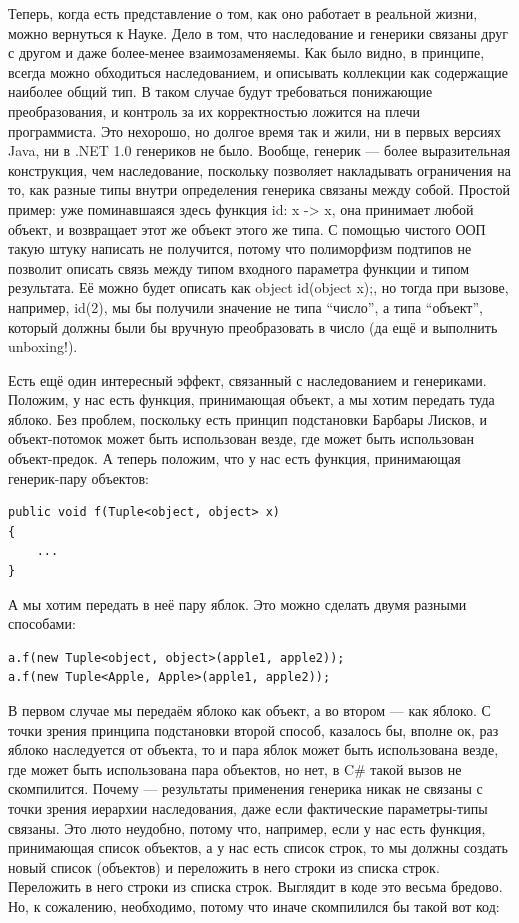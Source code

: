 \documentclass[a5paper]{article}
\begin{document}
Теперь, когда есть представление о том, как оно работает в реальной жизни, можно вернуться к Науке. Дело в том, что наследование и генерики связаны друг с другом и даже более-менее взаимозаменяемы. Как было видно, в принципе, всегда можно обходиться наследованием, и описывать коллекции как содержащие наиболее общий тип. В таком случае будут требоваться понижающие преобразования, и контроль за их корректностью ложится на плечи программиста. Это нехорошо, но долгое время так и жили, ни в первых версиях Java, ни в .NET 1.0 генериков не было. Вообще, генерик --- более выразительная конструкция, чем наследование, поскольку позволяет накладывать ограничения на то, как разные типы внутри определения генерика связаны между собой. Простой пример: уже поминавшаяся здесь функция id: x -> x, она принимает любой объект, и возвращает этот же объект этого же типа. С помощью чистого ООП такую штуку написать не получится, потому что полиморфизм подтипов не позволит описать связь между типом входного параметра функции и типом результата. Её можно будет описать как object id(object x);, но тогда при вызове, например, id(2), мы бы получили значение не типа ``число'', а типа ``объект'', который должны были бы вручную преобразовать в число (да ещё и выполнить unboxing!).

Есть ещё один интересный эффект, связанный с наследованием и генериками. Положим, у нас есть функция, принимающая объект, а мы хотим передать туда яблоко. Без проблем, поскольку есть принцип подстановки Барбары Лисков, и объект-потомок может быть использован везде, где может быть использован объект-предок. А теперь положим, что у нас есть функция, принимающая генерик-пару объектов:

\begin{verbatim}
public void f(Tuple<object, object> x)
{
    ...
}
\end{verbatim}

А мы хотим передать в неё пару яблок. Это можно сделать двумя разными способами:

\begin{verbatim}
a.f(new Tuple<object, object>(apple1, apple2));
a.f(new Tuple<Apple, Apple>(apple1, apple2));
\end{verbatim}

В первом случае мы передаём яблоко как объект, а во втором --- как яблоко. С точки зрения принципа подстановки второй способ, казалось бы, вполне ок, раз яблоко наследуется от объекта, то и пара яблок может быть использована везде, где может быть использована пара объектов, но нет, в C\# такой вызов не скомпилится. Почему --- результаты применения генерика никак не связаны с точки зрения иерархии наследования, даже если фактические параметры-типы связаны. Это люто неудобно, потому что, например, если у нас есть функция, принимающая список объектов, а у нас есть список строк, то мы должны создать новый список (объектов) и переложить в него строки из списка строк. Переложить в него строки из списка строк. Выглядит в коде это весьма бредово. Но, к сожалению, необходимо, потому что иначе скомпилился бы такой вот код:
\end{document}

